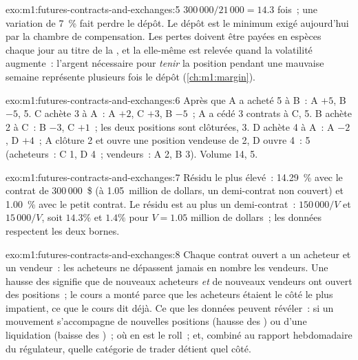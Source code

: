 \begin{solution}{exo:m1:futures-contracts-and-exchanges:5}
$300\,000/21\,000 = 14.3$ fois~; une variation de 7~\% fait perdre le dépôt. Le dépôt
est le minimum exigé aujourd'hui par la chambre de compensation. Les pertes doivent être
payées en espèces chaque jour au titre de la , et la  elle-même est relevée quand
la volatilité augmente~: l'argent nécessaire pour \emph{tenir} la position pendant une mauvaise
semaine représente plusieurs fois le dépôt (\cref{ch:m1:margin}).
\end{solution}

\begin{solution}{exo:m1:futures-contracts-and-exchanges:6}
Après que A a acheté 5 à B~: A $+5$, B $-5$,  5. C achète 3 à A~: A
$+2$, C $+3$, B $-5$~; A a cédé 3 contrats à C,  5. B achète
2 à C~: B $-3$, C $+1$~; les deux positions sont clôturées,  3. D achète 4 à A~: A
$-2$, D $+4$~; A clôture 2 et ouvre une position vendeuse de 2, D ouvre 4~:  5
(acheteurs~: C 1, D 4~; vendeurs~: A 2, B 3). Volume 14,  5.
\end{solution}

\begin{solution}{exo:m1:futures-contracts-and-exchanges:7}
Résidu le plus élevé~: 14.29~\% avec le contrat de 300\,000~\$ (à 1.05~million de dollars,
un demi-contrat non couvert) et 1.00~\% avec le petit contrat. Le résidu est au
plus un demi-contrat~: $150\,000/V$ et $15\,000/V$, soit $14.3\%$ et
$1.4\%$ pour $V = 1.05$ million de dollars~; les données respectent les deux bornes.
\end{solution}

\begin{solution}{exo:m1:futures-contracts-and-exchanges:8}
Chaque contrat ouvert a un acheteur et un vendeur~: les acheteurs ne dépassent jamais
en nombre les vendeurs. Une hausse des  signifie que de nouveaux acheteurs
\emph{et} de nouveaux vendeurs ont ouvert des positions~; le cours a monté parce que les
acheteurs étaient le côté le plus impatient, ce que le cours dit déjà. Ce que les données peuvent révéler~:
si un mouvement s'accompagne de nouvelles positions (hausse des ) ou
d'une liquidation (baisse des )~; où en est le roll~; et, combiné
au rapport hebdomadaire du régulateur, quelle catégorie de trader détient quel côté.
\end{solution}


